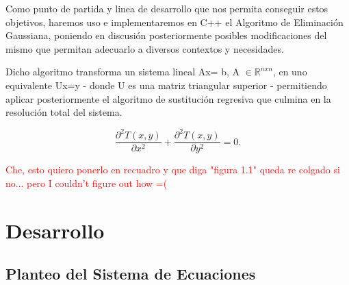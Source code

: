 \documentclass[double,12pt]{beavtex}
\begin{document}
Como punto de partida y linea de desarrollo que nos permita conseguir estos objetivos, haremos uso e implementaremos en C++ el Algoritmo de Eliminaci\'on Gaussiana, poniendo en discusi\'on posteriormente posibles modificaciones del mismo que permitan adecuarlo a diversos contextos y necesidades.

Dicho algoritmo transforma un sistema lineal Ax= b, A $\in \mathbb{R}^{nxn}$, en uno equivalente Ux=y - donde U es una matriz triangular superior - permitiendo aplicar posteriormente el algoritmo de sustituci\'on regresiva que culmina en la resoluci\'on total del sistema.

\begin{equation}
\frac{\partial^2T(x,y)}{\partial x^{2}}+\frac{\partial^2 T(x,y)}{\partial y^{2}} = 0.
\end{equation}


\textcolor{red}{Che, esto quiero ponerlo en recuadro y que diga "figura 1.1" queda re colgado si no... pero I couldn't figure out how =(}




\chapter{Desarrollo}

\section{Planteo del Sistema de Ecuaciones}
\end{document}
